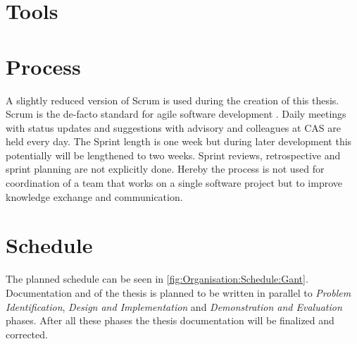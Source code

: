 \section{Tools}
\label{sec:Organisation:Tools}


\section{Process}
\label{sec:Organisation:Process}

A slightly reduced version of Scrum is used during the creation of this thesis. Scrum is the de-facto standard for agile software development \cite{glogerScrumPradigmenwechselIm2010}. Daily meetings with status updates and suggestions with advisory and colleagues at CAS are held every day. The Sprint length is one week but during later development this potentially will be lengthened to two weeks. Sprint reviews, retrospective and sprint planning are not explicitly done. Hereby the process is not used for coordination of a team that works on a single software project but to improve knowledge exchange and communication.

\section{Schedule}
\label{sec:Organisation:Schedule}

The planned schedule can be seen in \ref{fig:Organisation:Schedule:Gant}. Documentation and of the thesis is planned to be written in parallel to  \emph{Problem Identification}, \emph{Design and Implementation} and \emph{Demonstration and Evaluation} phases. After all these phases the thesis documentation will be finalized and corrected. 


